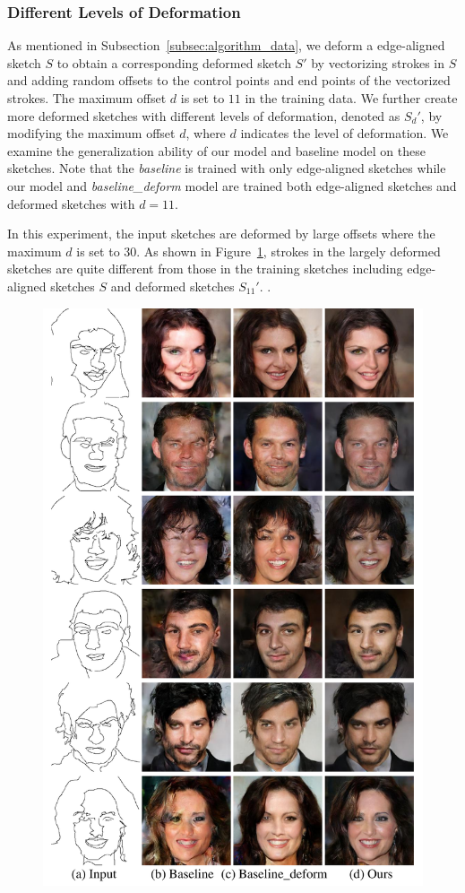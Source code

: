 \subsubsection{Different Levels of Deformation}
As mentioned in Subsection~\ref{subsec:algorithm_data}, we deform a edge-aligned sketch $S$ to obtain a corresponding deformed sketch $S'$ by vectorizing strokes in $S$ and adding random offsets to the control points and end points of the vectorized strokes. The maximum offset $d$ is set to $11$ in the training data. We further create more deformed sketches with different levels of deformation, denoted as $S_d'$, by modifying the maximum offset $d$, where $d$ indicates the level of deformation. We examine the generalization ability of our model and baseline model on these sketches. Note that the \textit{baseline} is trained with only edge-aligned sketches while our model and \textit{baseline\_deform} model are trained both edge-aligned sketches and deformed sketches with $d=11$.

In this experiment, the input sketches are deformed by large offsets where the maximum $d$ is set to $30$. 
As shown in Figure~\ref{fig:generalization_examples}, strokes in the largely deformed sketches are quite different from those in the training sketches including edge-aligned sketches $S$ and deformed sketches $S_11'$. .
\begin{figure}
	\includegraphics[width=0.9\linewidth]{figs/generalization_examples}
	\caption{}
	\label{fig:generalization_examples}
\end{figure}

